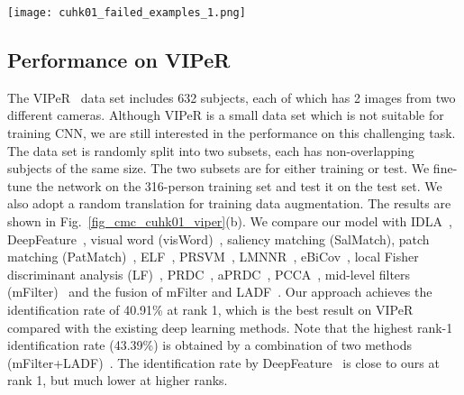 \documentclass[runningheads]{llncs}
\begin{document}
\begin{figure*}[!htbp]
  \centering

  \caption{CMC curves and rank-1 identification rates on CUHK01 (a) and VIPeR (b).}
  \label{fig_cmc_cuhk01_viper}
\end{figure*}

\begin{figure*}[!htb]
  \centering
  \texttt{[image: cuhk01\_failed\_examples\_1.png]}
  \caption{Some failed cases on CUHK01 by the proposed method. Left: true gallery. Middle: probe. Right: false positive.}
  \label{fig_cuhk01_failed}
\end{figure*}

\subsection{Performance on VIPeR}
\label{section_Performance on VIPeR}

The VIPeR~\cite{gray2007evaluating} data set includes 632 subjects, each of which has 2 images from two different cameras.
Although VIPeR is a small data set which is not suitable for training CNN, we are still interested in the performance on this challenging task.
The data set is randomly split into two subsets, each has non-overlapping subjects of the same size. The two subsets are for either training or test.
We fine-tune the network on the 316-person training set and test it on the test set.
We also adopt a random translation for training data augmentation.
The results are shown in Fig.~\ref{fig_cmc_cuhk01_viper}(b).
We compare our model with IDLA~\cite{ahmed2015improved}, DeepFeature~\cite{ding2015deep}, visual word (visWord)~\cite{zhang2014novel}, saliency matching (SalMatch), patch matching (PatMatch)~\cite{zhao2013person}, ELF~\cite{gheissari2006person}, PRSVM~\cite{bazzani2012multiple}, LMNNR~\cite{bak2011multiple}, eBiCov~\cite{ma2012bicov}, local Fisher discriminant analysis (LF)~\cite{pedagadi2013local}, PRDC~\cite{zheng2011person}, aPRDC~\cite{liu2012person}, PCCA~\cite{mignon2012pcca}, mid-level filters (mFilter)~\cite{zhao2014learning} and the fusion of mFilter and LADF~\cite{li2013learning}.
Our approach achieves the identification rate of 40.91\% at rank 1, which is the best result on VIPeR compared with the existing deep learning methods.
Note that the highest rank-1 identification rate (43.39\%) is obtained by a combination of two methods (mFilter+LADF)~\cite{li2013learning}.
The identification rate by DeepFeature~\cite{ding2015deep} is close to ours at rank 1, but much lower at higher ranks.
\end{document}
